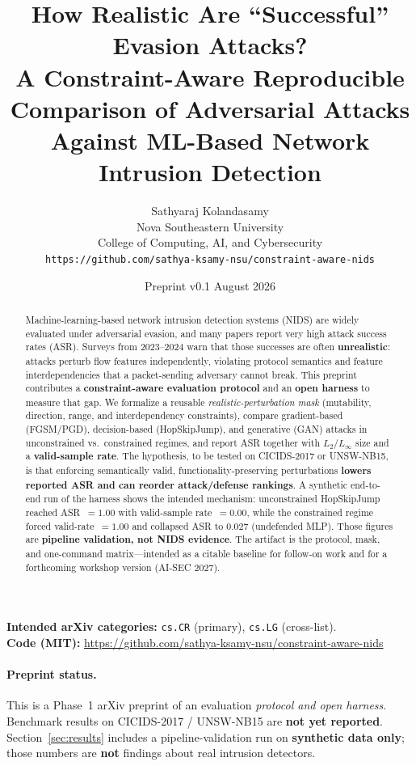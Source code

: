 \documentclass[11pt,a4paper]{article}
\title{How Realistic Are ``Successful'' Evasion Attacks?\\
\large A Constraint-Aware Reproducible Comparison of Adversarial Attacks\\
Against ML-Based Network Intrusion Detection}
\author{Sathyaraj Kolandasamy\\
Nova Southeastern University\\
College of Computing, AI, and Cybersecurity\\
\texttt{https://github.com/sathya-ksamy-nsu/constraint-aware-nids}}
\date{Preprint v0.1 \quad 25 August 2026}
\begin{document}
\maketitle

\begin{abstract}
Machine-learning-based network intrusion detection systems (NIDS) are widely evaluated under adversarial evasion, and many papers report very high attack success rates (ASR). Surveys from 2023--2024 warn that those successes are often \textbf{unrealistic}: attacks perturb flow features independently, violating protocol semantics and feature interdependencies that a packet-sending adversary cannot break. This preprint contributes a \textbf{constraint-aware evaluation protocol} and an \textbf{open harness} to measure that gap. We formalize a reusable \emph{realistic-perturbation mask} (mutability, direction, range, and interdependency constraints), compare gradient-based (FGSM/PGD), decision-based (HopSkipJump), and generative (GAN) attacks in unconstrained vs.\ constrained regimes, and report ASR together with $L_2$/$L_\infty$ size and a \textbf{valid-sample rate}. The hypothesis, to be tested on CICIDS-2017 or UNSW-NB15, is that enforcing semantically valid, functionality-preserving perturbations \textbf{lowers reported ASR and can reorder attack/defense rankings}. A synthetic end-to-end run of the harness shows the intended mechanism: unconstrained HopSkipJump reached ASR~$=1.00$ with valid-sample rate~$=0.00$, while the constrained regime forced valid-rate~$=1.00$ and collapsed ASR to $0.027$ (undefended MLP). Those figures are \textbf{pipeline validation, not NIDS evidence}. The artifact is the protocol, mask, and one-command matrix---intended as a citable baseline for follow-on work and for a forthcoming workshop version (AI-SEC 2027).
\end{abstract}

\noindent\textbf{Intended arXiv categories:} \texttt{cs.CR} (primary), \texttt{cs.LG} (cross-list).\\
\textbf{Code (MIT):} \url{https://github.com/sathya-ksamy-nsu/constraint-aware-nids}

\paragraph{Preprint status.}
This is a Phase~1 arXiv preprint of an evaluation \emph{protocol and open harness}. Benchmark results on CICIDS-2017 / UNSW-NB15 are \textbf{not yet reported}. Section~\ref{sec:results} includes a pipeline-validation run on \textbf{synthetic data only}; those numbers are \textbf{not} findings about real intrusion detectors.
\end{document}
